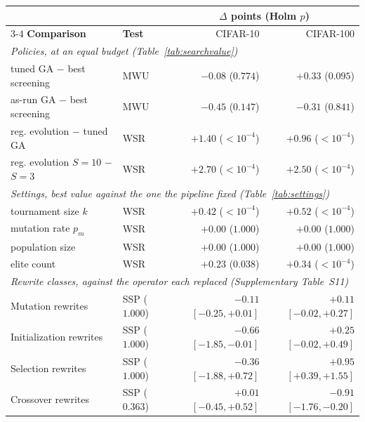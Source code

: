 \begin{tabular}{l l r r}
\toprule
& & \multicolumn{2}{c}{$\Delta$ points (Holm $p$)} \\
\cmidrule(lr){3-4}
\textbf{Comparison} & \textbf{Test} & CIFAR-10 & CIFAR-100 \\
\midrule
\multicolumn{4}{l}{\textit{Policies, at an equal budget (Table~\ref{tab:searchvalue})}} \\
tuned GA $-$ best screening & MWU & $-0.08$ ($0.774$) & $+0.33$ ($0.095$) \\
as-run GA $-$ best screening & MWU & $-0.45$ ($0.147$) & $-0.31$ ($0.841$) \\
reg. evolution $-$ tuned GA & WSR & $+1.40$ ($<10^{-4}$) & $+0.96$ ($<10^{-4}$) \\
reg. evolution $S{=}10$ $-$ $S{=}3$ & WSR & $+2.70$ ($<10^{-4}$) & $+2.50$ ($<10^{-4}$) \\
\midrule
\multicolumn{4}{l}{\textit{Settings, best value against the one the pipeline fixed (Table~\ref{tab:settings})}} \\
tournament size $k$ & WSR & $+0.42$ ($<10^{-4}$) & $+0.52$ ($<10^{-4}$) \\
mutation rate $p_m$ & WSR & $+0.00$ ($1.000$) & $+0.00$ ($1.000$) \\
population size & WSR & $+0.00$ ($1.000$) & $+0.00$ ($1.000$) \\
elite count & WSR & $+0.23$ ($0.038$) & $+0.34$ ($<10^{-4}$) \\
\midrule
\multicolumn{4}{l}{\textit{Rewrite classes, against the operator each replaced (Supplementary Table~S11)}} \\
Mutation rewrites & SSP ($1.000$) & $-0.11$ \scriptsize$[-0.25,+0.01]$ & $+0.11$ \scriptsize$[-0.02,+0.27]$ \\
Initialization rewrites & SSP ($1.000$) & $-0.66$ \scriptsize$[-1.85,-0.01]$ & $+0.25$ \scriptsize$[-0.02,+0.49]$ \\
Selection rewrites & SSP ($1.000$) & $-0.36$ \scriptsize$[-1.88,+0.72]$ & $+0.95$ \scriptsize$[+0.39,+1.55]$ \\
Crossover rewrites & SSP ($0.363$) & $+0.01$ \scriptsize$[-0.45,+0.52]$ & $-0.91$ \scriptsize$[-1.76,-0.20]$ \\
\bottomrule
\end{tabular}
